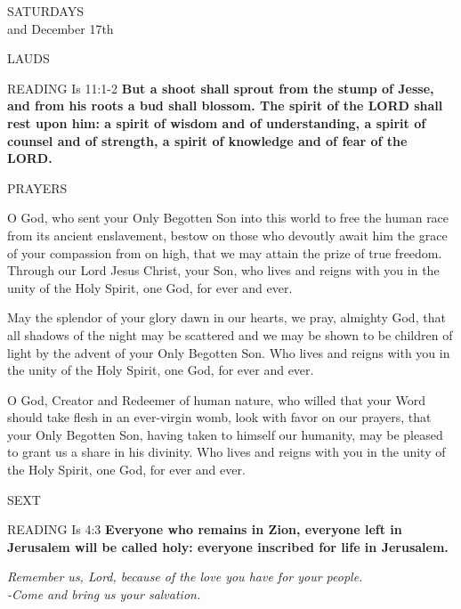 \begin{center}\normalsize{\uppercase{Saturdays}}\\
\footnotesize{and December 17th}\end{center}
\begin{flushleft}\normalsize{\uppercase{Lauds\\}}\end{flushleft}
\noindent\small{\uppercase{Reading}} Is 11:1-2 \textbf{ But a shoot shall sprout from the stump of Jesse, and from his roots a bud shall blossom. The spirit of the LORD shall rest upon him: a spirit of wisdom and of understanding, a spirit of counsel and of strength, a spirit of knowledge and of fear of the LORD.\\}

\noindent\small{\uppercase{Prayers}}\begin{description}[labelindent=\parindent, leftmargin=*]
\item [Week 1] O God, who sent your Only Begotten Son into this world to free the human race from its ancient enslavement, bestow on those who devoutly await him the grace of your compassion from on high, that we may attain the prize of true freedom. Through our Lord Jesus Christ, your Son, who lives and reigns with you in the unity of the Holy Spirit, one God, for ever and ever.
\item [Week 2] May the splendor of your glory dawn in our hearts, we pray, almighty God, that all shadows of the night may be scattered and we may be shown to be children of light by the advent of your Only Begotten Son. Who lives and reigns with you in the unity of the Holy Spirit, one God, for ever and ever.
\item [December 17th] O God, Creator and Redeemer of human nature, who willed that your Word should take flesh in an ever-virgin womb, look with favor on our prayers, that your Only Begotten Son, having taken to himself our humanity, may be pleased to grant us a share in his divinity. Who lives and reigns with you in the unity of the Holy Spirit, one God, for ever and ever.
\end{description}

\begin{flushleft}\normalsize{\uppercase{Sext\\}}\end{flushleft}
\noindent\small{\uppercase{Reading}} Is 4:3 \textbf{ Everyone who remains in Zion, everyone left in Jerusalem will be called holy: everyone inscribed for life in Jerusalem.\\}
\begin{center}\textit{Remember us, Lord, because of the love you have for your people.\\
-Come and bring us your salvation.}\end{center}
                                   
